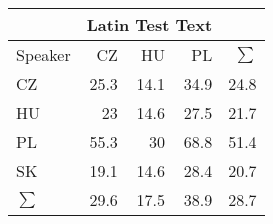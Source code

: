 \begin{tabular}{l|rrr|r}
\hline
 & \multicolumn{3}{c}{Latin Test Text} & \\
\hline
 Speaker   &   CZ &   HU &   PL &   $\sum$ \\
\hline
 CZ        & 25.3 & 14.1 & 34.9 &     24.8 \\
 HU        & 23   & 14.6 & 27.5 &     21.7 \\
 PL        & 55.3 & 30   & 68.8 &     51.4 \\
 SK        & 19.1 & 14.6 & 28.4 &     20.7 \\
\hline
 $\sum$   & 29.6 & 17.5 & 38.9 &     28.7 \\
\hline
\end{tabular}